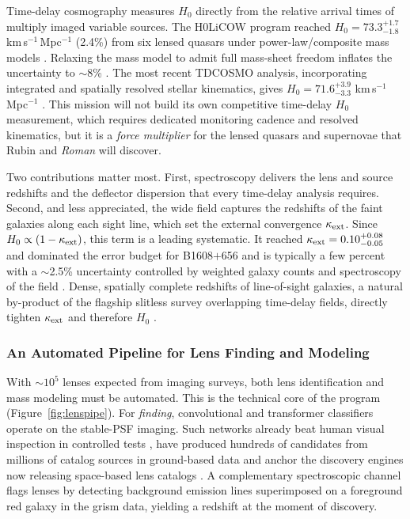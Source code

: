 \documentclass[10pt,onecolumn]{article}
\newcommand{\kms}{km\,s$^{-1}$}
\begin{document}
Time-delay cosmography measures $H_0$ directly from the relative arrival times of multiply imaged variable sources. The H0LiCOW program reached $H_0=73.3^{+1.7}_{-1.8}$ \kms\,Mpc$^{-1}$ (2.4\%) from six lensed quasars under power-law/composite mass models \cite{wong2020}. Relaxing the mass model to admit full mass-sheet freedom inflates the uncertainty to $\sim$8\% \cite{birrer2020}. The most recent TDCOSMO analysis, incorporating integrated and spatially resolved stellar kinematics, gives $H_0=71.6^{+3.9}_{-3.3}$ \kms\,Mpc$^{-1}$ \cite{birrer2025}. This mission will not build its own competitive time-delay $H_0$ measurement, which requires dedicated monitoring cadence and resolved kinematics, but it is a \emph{force multiplier} for the lensed quasars and supernovae that Rubin and \textit{Roman} will discover.

Two contributions matter most. First, spectroscopy delivers the lens and source redshifts and the deflector dispersion that every time-delay analysis requires. Second, and less appreciated, the wide field captures the redshifts of the faint galaxies along each sight line, which set the external convergence $\kappa_{\rm ext}$. Since $H_0\propto(1-\kappa_{\rm ext})$, this term is a leading systematic. It reached $\kappa_{\rm ext}=0.10^{+0.08}_{-0.05}$ and dominated the error budget for B1608$+$656 \cite{suyu2010} and is typically a few percent with a $\sim$2.5\% uncertainty controlled by weighted galaxy counts and spectroscopy of the field \cite{rusu2017,wells2023}. Dense, spatially complete redshifts of line-of-sight galaxies, a natural by-product of the flagship slitless survey overlapping time-delay fields, directly tighten $\kappa_{\rm ext}$ and therefore $H_0$ \cite{greene2013}.

\subsubsection{An Automated Pipeline for Lens Finding and Modeling}

With $\sim$$10^5$ lenses expected from imaging surveys, both lens identification and mass modeling must be automated. This is the technical core of the program (Figure~\ref{fig:lenspipe}). For \emph{finding}, convolutional and transformer classifiers operate on the stable-PSF imaging. Such networks already beat human visual inspection in controlled tests \cite{metcalf2019}, have produced hundreds of candidates from millions of catalog sources in ground-based data \cite{jacobs2019} and anchor the discovery engines now releasing space-based lens catalogs \cite{walmsley2025}. A complementary spectroscopic channel flags lenses by detecting background emission lines superimposed on a foreground red galaxy in the grism data, yielding a redshift at the moment of discovery.
\end{document}
